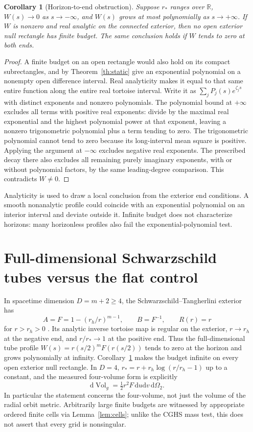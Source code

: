 \documentclass[11pt,letterpaper]{article}
\newtheorem{corollary}[theorem]{Corollary}
\newcommand{\vol}{\operatorname{Vol}}
\newcommand{\dd}{\mathrm{d}}
\begin{document}
\begin{corollary}[Horizon-to-end obstruction]\label{co:exterior}
Suppose $r_*$ ranges over $\mathbb R$, $W(s)\to0$ as $s\to-\infty$, and $W(s)$ grows at most polynomially as $s\to+\infty$. If $W$ is nonzero and real analytic on the connected exterior, then no open exterior null rectangle has finite budget. The same conclusion holds if $W$ tends to zero at both ends.
\end{corollary}
\begin{proof}
A finite budget on an open rectangle would also hold on its compact subrectangles, and by Theorem~\ref{th:static} give an exponential polynomial on a nonempty open difference interval. Real analyticity makes it equal to that same entire function along the entire real tortoise interval. Write it as $\sum_j P_j(s)e^{\zeta_j s}$ with distinct exponents and nonzero polynomials. The polynomial bound at $+\infty$ excludes all terms with positive real exponents: divide by the maximal real exponential and the highest polynomial power at that exponent, leaving a nonzero trigonometric polynomial plus a term tending to zero. The trigonometric polynomial cannot tend to zero because its long-interval mean square is positive. Applying the argument at $-\infty$ excludes negative real exponents. The prescribed decay there also excludes all remaining purely imaginary exponents, with or without polynomial factors, by the same leading-degree comparison. This contradicts $W\ne0$.
\end{proof}

Analyticity is used to draw a local conclusion from the exterior end conditions. A smooth nonanalytic profile could coincide with an exponential polynomial on an interior interval and deviate outside it. Infinite budget does not characterize horizons: many horizonless profiles also fail the exponential-polynomial test.

\section{Full-dimensional Schwarzschild tubes versus the flat control}

In spacetime dimension $D=m+2\ge4$, the Schwarzschild--Tangherlini exterior has
\begin{equation}
 A=F=1-(r_h/r)^{m-1},\qquad B=F^{-1},\qquad R(r)=r
 \label{eq:std}
\end{equation}
for $r>r_h>0$ \cite{Tangherlini}. Its analytic inverse tortoise map is regular on the exterior, $r\to r_h$ at the negative end, and $r/r_*\to1$ at the positive end. Thus the full-dimensional tube profile $W(s)=r(s/2)^m F(r(s/2))$ tends to zero at the horizon and grows polynomially at infinity. Corollary~\ref{co:exterior} makes the budget infinite on every open exterior null rectangle. In $D=4$, $r_*=r+r_h\log(r/r_h-1)$ up to a constant, and the measured four-volume form is explicitly
\[
 \dd\vol_g=\tfrac12 r^2 F\,\dd u\dd v\,\dd\Omega_2 .
\]
In particular the statement concerns the four-volume, not just the volume of the radial orbit metric. Arbitrarily large finite budgets are witnessed by appropriate ordered finite cells via Lemma~\ref{lem:cells}; unlike the CGHS mass test, this does not assert that every grid is nonsingular.
\end{document}
